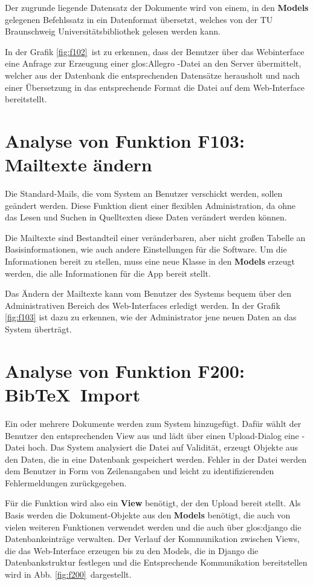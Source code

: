 Der zugrunde liegende Datensatz der Dokumente wird von einem, in den
\textbf{Models} gelegenen Befehlssatz in ein Datenformat übersetzt, welches von
der TU Braunschweig Universitätsbibliothek gelesen werden kann. 

In der Grafik \ref{fig:f102}\ ist zu erkennen, dass der Benutzer über das
Webinterface eine Anfrage zur Erzeugung einer \gls{glos:Allegro} -Datei an den
Server übermittelt, welcher aus der Datenbank die entsprechenden Datensätze
herausholt und nach einer Übersetzung in das entsprechende Format die Datei auf
dem Web-Interface bereitstellt.

\section{Analyse von Funktion F103: Mailtexte ändern}
Die Standard-Mails, die vom System an Benutzer verschickt werden, sollen geändert
werden. Diese Funktion dient einer flexiblen Administration, da ohne das Lesen
und Suchen in Quelltexten diese Daten verändert werden können.

Die Mailtexte sind Bestandteil einer veränderbaren, aber nicht großen Tabelle an
Basisinformationen, wie auch andere Einstellungen für die Software. Um die
Informationen bereit zu stellen, muss eine neue Klasse in den \textbf{Models}
erzeugt werden, die alle Informationen für die App bereit stellt.

Das Ändern der Mailtexte kann vom Benutzer des Systems bequem über den
Administrativen Bereich des Web-Interfaces erledigt werden. In der Grafik
\ref{fig:f103} ist dazu zu erkennen, wie der Administrator jene neuen Daten an
das System überträgt.

\section{Analyse von Funktion F200: Bib\TeX\ Import}
Ein oder mehrere Dokumente werden zum System hinzugefügt. Dafür wählt der
Benutzer den entsprechenden View aus und lädt über einen Upload-Dialog eine
\BibTeX -Datei hoch. Das System analysiert die Datei auf Validität, erzeugt
Objekte aus den Daten, die in eine Datenbank gespeichert werden. Fehler in der
Datei werden dem Benutzer in Form von Zeilenangaben und leicht zu
identifizierenden Fehlermeldungen zurückgegeben.


Für die Funktion wird also ein \textbf{View} benötigt, der den Upload bereit
stellt.  Als Basis werden die Dokument-Objekte aus den \textbf{Models} benötigt,
die auch von vielen weiteren Funktionen verwendet werden und die auch über
\gls{glos:django} die Datenbankeinträge verwalten. Der Verlauf der Kommunikation
zwischen Views, die das Web-Interface erzeugen bis zu den Models, die in Django
die Datenbankstruktur festlegen und die Entsprechende Kommunikation
bereitstellen wird in Abb. \ref{fig:f200}\ dargestellt.
